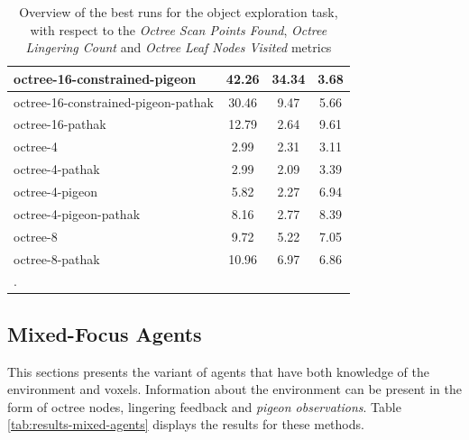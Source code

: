 \begin{longtable}{|l|c|c|c|}
octree-16-constrained-pigeon & 42.26 & {\cellcolor[HTML]{55AA99}} \color[HTML]{F1F1F1} 34.34 & 3.68 \\ \hline
octree-16-constrained-pigeon-pathak & 30.46 & {\cellcolor[HTML]{C9E2DC}} \color[HTML]{000000} 9.47 & 5.66 \\ \hline
octree-16-pathak & 12.79 & {\cellcolor[HTML]{E9F1EF}} \color[HTML]{000000} 2.64 & 9.61 \\ \hline
octree-4 & 2.99 & {\cellcolor[HTML]{EBF2F0}} \color[HTML]{000000} 2.31 & 3.11 \\ \hline
octree-4-pathak & 2.99 & {\cellcolor[HTML]{EBF2F0}} \color[HTML]{000000} 2.09 & 3.39 \\ \hline
octree-4-pigeon & 5.82 & {\cellcolor[HTML]{EBF2F0}} \color[HTML]{000000} 2.27 & 6.94 \\ \hline
octree-4-pigeon-pathak & 8.16 & {\cellcolor[HTML]{E8F1EF}} \color[HTML]{000000} 2.77 & 8.39 \\ \hline
octree-8 & 9.72 & {\cellcolor[HTML]{DDEBE8}} \color[HTML]{000000} 5.22 & 7.05 \\ \hline
octree-8-pathak & 10.96 & {\cellcolor[HTML]{D5E7E3}} \color[HTML]{000000} 6.97 & 6.86 \\ \hline


    \caption{Overview of the best runs for the object exploration task, with respect to the \textit{Octree Scan Points Found}, \textit{Octree Lingering Count} and \textit{Octree Leaf Nodes Visited} metrics}. \label{tab:RQ2-results-comparative-voxeloctree}
\end{longtable}


\subsection{Mixed-Focus Agents}
This sections presents the variant of agents that have both knowledge of the environment and voxels. Information about the environment can be present in the form of octree nodes, lingering feedback and \textit{pigeon observations}. Table \ref{tab:results-mixed-agents} displays the results for these methods.

